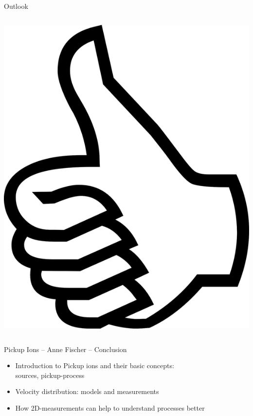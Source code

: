 \documentclass{beamer}
\begin{document}
\begin{frame}{Outlook}
\begin{columns}
\begin{columns}
		\column{1.5cm}
		\includegraphics[scale=0.05]{pictures/thumbsup.png}
		\end{columns}
		
	\end{columns}
\end{frame}
\begin{frame}{Pickup Ions -- Anne Fischer -- Conclusion}
\begin{itemize}
	\item Introduction to Pickup ions and their basic concepts: \\
	sources, pickup-process
	\vspace{1cm}
	\item Velocity distribution: models and measurements
	\vspace{1cm}
	\item How 2D-measurements can help to understand processes better
\end{itemize}
\end{frame}
%
%
%
\end{document}

